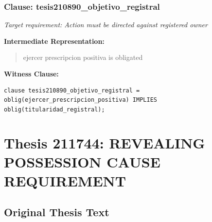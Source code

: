 \documentclass[11pt,a4paper]{article}
\begin{document}
\subsubsection{Clause: tesis210890\_objetivo\_registral}

\textit{Target requirement: Action must be directed against registered owner}

\textbf{Intermediate Representation:}

\begin{quote}
ejercer prescripcion positiva is obligated
\end{quote}

\textbf{Witness Clause:}

\begin{lstlisting}[style=witnessstyle, language=Witness]
clause tesis210890_objetivo_registral = oblig(ejercer_prescripcion_positiva) IMPLIES oblig(titularidad_registral);
\end{lstlisting}

\newpage

\section{Thesis 211744: REVEALING POSSESSION CAUSE REQUIREMENT}
\label{thesis:211744}

\subsection{Original Thesis Text}
\end{document}

